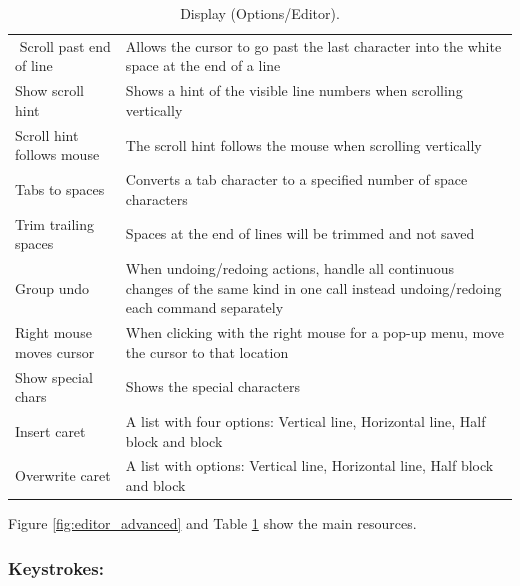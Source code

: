 \begin{table}
\begin{footnotesize}
\begin{tabularx}{\headwidth}{lX}
$$      Scroll past end of line & Allows the cursor to go past the last character into the white space at the end of a line \\
      Show scroll hint & Shows a hint of the visible line numbers when scrolling vertically \\
      Scroll hint follows mouse & The scroll hint follows the mouse when scrolling vertically \\
      Tabs to spaces & Converts a tab character to a specified number of space characters \\
      Trim trailing spaces & Spaces at the end of lines will be trimmed and not saved \\
      Group undo & When undoing/redoing actions, handle all continuous changes of the same kind in one call instead undoing/redoing
      each command separately \\
      Right mouse moves cursor & When clicking with the right mouse for a pop-up menu, move the cursor to that location \\
      Show special chars & Shows the special characters \\
      \hline %
      Insert caret & A list with four options: Vertical line, Horizontal line, Half block and block \\
      Overwrite caret & A list with options: Vertical line, Horizontal line, Half block and block \\
      \hline
    \end{tabularx}
  \end{footnotesize}
  \caption{Display (Options/Editor).}
  \label{tab:editor_advanced}
\end{table}

Figure \ref{fig:editor_advanced} and
Table \ref{tab:editor_advanced}
show the main resources.


\hypertarget{working_editor_keystrokes}{}
\subsubsection{Keystrokes:}

